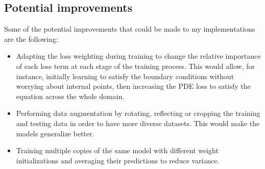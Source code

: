 \subsection{Potential improvements}

Some of the potential improvements that could be made to my implementations are the following:

\begin{itemize}
	\item Adapting the loss weighting during training to change the relative importance of each loss term at each stage of the training process. This would allow, for instance, initially learning to satisfy the boundary conditions without worrying about internal points, then increasing the PDE loss to satisfy the equation across the whole domain.
	\item Performing data augmentation by rotating, reflecting or cropping the training and testing data in order to have more diverse datasets. This would make the models generalize better.
	\item Training multiple copies of the same model with different weight initializations and averaging their predictions to reduce variance. 
\end{itemize}


